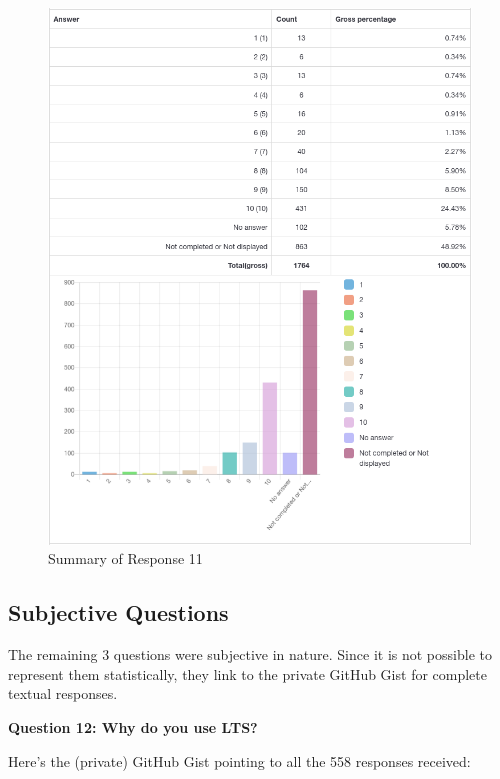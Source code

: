 \documentclass{article}
\begin{document}
\vspace{3mm}
\begin{figure}[h!]
\centering
\includegraphics[width=16.3cm]{assets/11-summary.png}
\caption{Summary of Response 11}
\end{figure}

\newpage

\subsection{Subjective Questions}

\vspace{3mm}
\large
The remaining 3 questions were subjective in nature. Since it is not possible to represent them
statistically, they link to the private GitHub Gist for complete textual responses.

\vspace{15mm}
\large{\textbf{Question 12: Why do you use LTS?}}

\vspace{3mm}
\large Here's the (private) GitHub Gist pointing to all the 558 responses received:
\end{document}
